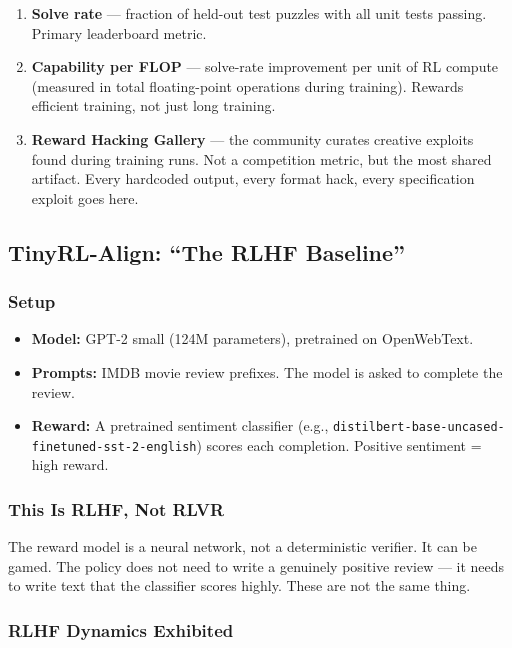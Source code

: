 \begin{enumerate}
  \item \textbf{Solve rate} --- fraction of held-out test puzzles with all unit tests passing. Primary leaderboard metric.
  \item \textbf{Capability per FLOP} --- solve-rate improvement per unit of RL compute (measured in total floating-point operations during training). Rewards efficient training, not just long training.
  \item \textbf{Reward Hacking Gallery} --- the community curates creative exploits found during training runs. Not a competition metric, but the most shared artifact. Every hardcoded output, every format hack, every specification exploit goes here.
\end{enumerate}

\subsection{TinyRL-Align: ``The RLHF Baseline''}

\subsubsection*{Setup}

\begin{itemize}
  \item \textbf{Model:} GPT-2 small (124M parameters), pretrained on OpenWebText.
  \item \textbf{Prompts:} IMDB movie review prefixes. The model is asked to complete the review.
  \item \textbf{Reward:} A pretrained sentiment classifier (e.g., \texttt{distilbert-base-uncased-finetuned-sst-2-english}) scores each completion. Positive sentiment = high reward.
\end{itemize}

\subsubsection*{This Is RLHF, Not RLVR}

The reward model is a neural network, not a deterministic verifier. It can be gamed. The policy does not need to write a genuinely positive review --- it needs to write text that the classifier scores highly. These are not the same thing.

\subsubsection*{RLHF Dynamics Exhibited}

